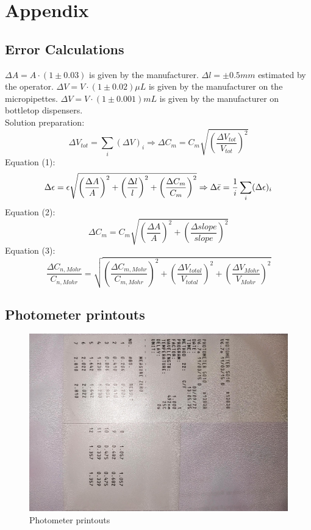 \documentclass[twocolumn]{article}
\begin{document}
\section{Appendix}
\subsection{Error Calculations}
$\Delta A = A \cdot (1 \pm 0.03)$ is given by the manufacturer.
$\Delta l = \pm 0.5 mm$ estimated by the operator.
$\Delta V = V \cdot (1 \pm 0.02) \mu L$ is given by the manufacturer on the micropipettes.
$\Delta V = V \cdot (1 \pm 0.001) mL$ is given by the manufacturer on  bottletop dispensers. \\ Solution preparation: \[\Delta V_{tot} = \sum_i(\Delta V)_i \Rightarrow \Delta C_m = C_m \sqrt{\left( \frac{\Delta V_{tot}}{V_{tot}} \right)^2}\]
Equation (1): \[ \Delta \epsilon = \epsilon \sqrt{\left( \frac{\Delta A}{A} \right)^2+\left( \frac{\Delta l}{l} \right)^2+\left( \frac{\Delta C_m}{C_m} \right)^2} \Rightarrow \Delta \Bar{\epsilon} = \frac{1}{i}\sum_i (\Delta \epsilon)_i\]
Equation (2): \[ \Delta C_m = C_m \sqrt{ \left( \frac{\Delta A}{A} \right)^2 +\left( \frac{\Delta slope}{slope} \right)^2}\]
Equation (3): \[ \frac{\Delta C_{n,Mohr}}{C_{n,Mohr}} = \sqrt{ \left( \frac{\Delta C_{m,Mohr}}{C_{m,Mohr}} \right)^2 + \left( \frac{\Delta V_{total}}{V_{total}} \right)^2 + \left( \frac{\Delta V_{Mohr}}{V_{Mohr}} \right)^2} \]
\clearpage
\subsection{Photometer printouts}
\begin{figure}[ht]
    \centering
    \includegraphics[width=14cm]{2022_03_13 20_01 Office Lens.jpg}
    \caption{Photometer printouts}
    \label{fig:my_label}
\end{figure}
\FloatBarrier
\end{document}
